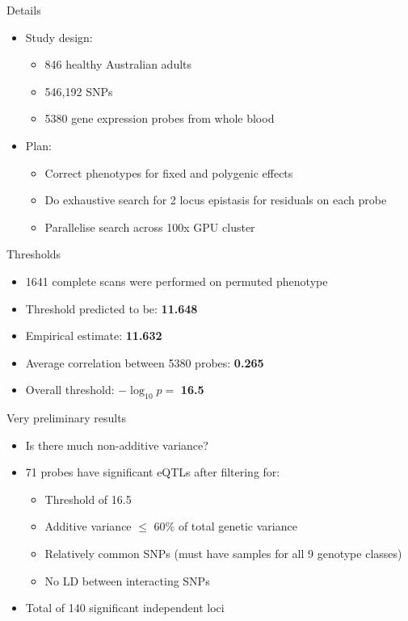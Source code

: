 \documentclass{beamer}
\begin{document}
\begin{frame}{Details}
	\begin{itemize}
		\item Study design:
		\begin{itemize}
			\item 846 healthy Australian adults
			\item 546,192 SNPs
			\item 5380 gene expression probes from whole blood
		\end{itemize}
		\item Plan:
		\begin{itemize}
			\item Correct phenotypes for fixed and polygenic effects
			\item Do exhaustive search for 2 locus epistasis for residuals on each probe
			\item Parallelise search across 100x GPU cluster
		\end{itemize}
	\end{itemize}
\end{frame}

\begin{frame}{Thresholds}
	\begin{itemize}
		\item 1641 complete scans were performed on permuted phenotype
		\item Threshold predicted to be: \textbf{11.648}
		\item Empirical estimate: \textbf{11.632}
		\item Average correlation between 5380 probes: \textbf{0.265}
		\item Overall threshold: $-\log_{10}p =$ \textbf{16.5}
	\end{itemize}
\end{frame}

\begin{frame}{Very preliminary results}
	\begin{itemize}
	\item Is there much non-additive variance?
	\item 71 probes have significant eQTLs after filtering for:
	\begin{itemize}
	\item Threshold of 16.5
	\item Additive variance $\leq$ 60\% of total genetic variance
	\item Relatively common SNPs (must have samples for all 9 genotype classes)
	\item No LD between interacting SNPs
	\end{itemize}
	\item Total of 140 significant independent loci
	\end{itemize}
\end{frame}
\end{document}
